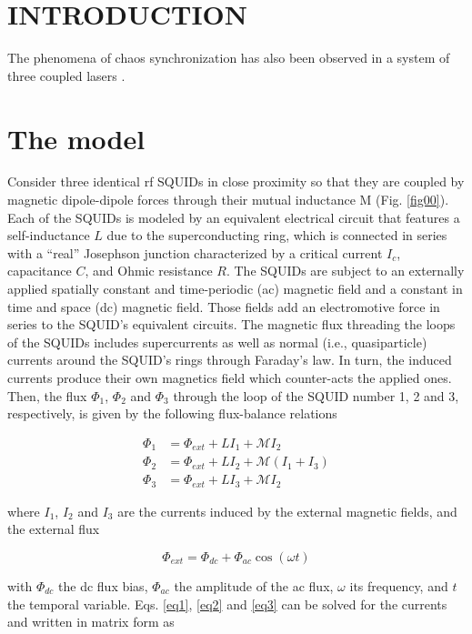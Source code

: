 \documentclass[aps,pre,reprint,groupedaddress]{revtex4-1}
\begin{document}
\section{INTRODUCTION}
\label{sec:introduction}

The phenomena of chaos synchronization has also been observed in a system of three coupled lasers \cite{Winful1990}.


\section{The model} 
Consider three identical rf SQUIDs in close proximity so that
they are coupled by magnetic dipole-dipole forces through
their mutual inductance M (Fig. \ref{fig00}). Each of the SQUIDs
is modeled by an equivalent electrical circuit that features a
self-inductance $L$ due to the superconducting ring, which is
connected in series with a “real” Josephson junction characterized
by a critical current $I_{c}$, capacitance $C$, and Ohmic resistance
$R$. The SQUIDs are subject to an externally applied
spatially constant and time-periodic (ac) magnetic field and a
constant in time and space (dc) magnetic field. Those fields
add an electromotive force in series to the SQUID’s equivalent
circuits. The magnetic flux threading the loops of the SQUIDs
includes supercurrents as well as normal (i.e., quasiparticle)
currents around the SQUID’s rings through Faraday’s law. In
turn, the induced currents produce their own magnetics field
which counter-acts the applied ones. Then, the flux $\Phi_{1}$, $\Phi_{2}$ and $\Phi_{3}$
through the loop of the SQUID number 1, 2 and 3, respectively,
is given by the following flux-balance relations


\begin{align} 
\label{eq1}
\Phi_{1} &= \Phi_{ext} + LI_{1} + \mathcal{M} I_{2} \\ 
\label{eq2}
\Phi_{2} &= \Phi_{ext} + LI_{2} + \mathcal{M} (I_{1} + I_{3}) \\
\label{eq3}
\Phi_{3} &= \Phi_{ext} + LI_{3} + \mathcal{M} I_{2} 
\end{align}

where $I_{1}$, $I_{2}$ and $I_{3}$ are the currents induced by the external magnetic
fields, and the external flux

\begin{equation} \label{eq4}
\Phi_{ext} = \Phi_{dc} + \Phi_{ac} \cos(\omega t)
\end{equation}

with $\Phi_{dc}$ the dc flux bias, $\Phi_{ac}$ the amplitude of the ac flux, $\omega$
its frequency, and $t$ the temporal variable. Eqs. \ref{eq1}, \ref{eq2} and \ref{eq3} can
be solved for the currents and written in matrix form as
\end{document}
